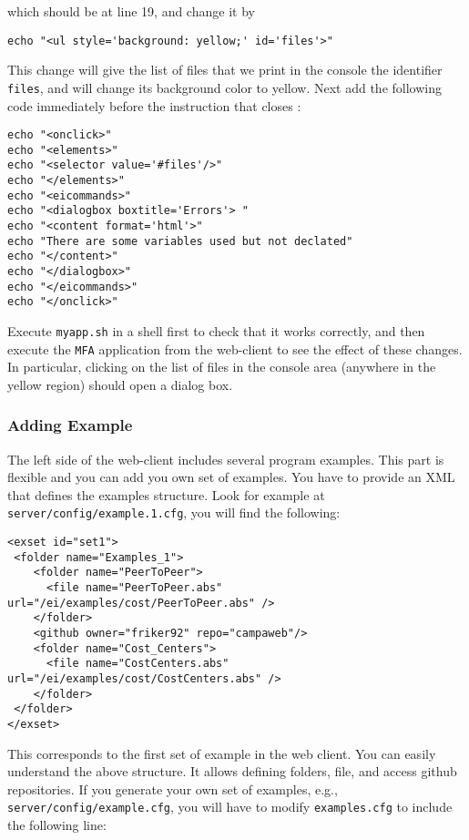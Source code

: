 \medskip
\noindent
which should be at line 19, and change it by

\medskip
\begin{lstlisting}[style=script]
echo "<ul style='background: yellow;' id='files'>"
\end{lstlisting}

\medskip
\noindent
This change will give the list of files that we print in the console
the identifier \texttt{files}, and will change its background color to
yellow. Next add the following code immediately before the instruction
that closes :

\medskip
\begin{lstlisting}[style=script]
echo "<onclick>"
echo "<elements>"
echo "<selector value='#files'/>"
echo "</elements>"
echo "<eicommands>"
echo "<dialogbox boxtitle='Errors'> "
echo "<content format='html'>"
echo "There are some variables used but not declated"
echo "</content>"
echo "</dialogbox>"
echo "</eicommands>"
echo "</onclick>"
\end{lstlisting}

\medskip
\noindent
Execute \texttt{myapp.sh} in a shell first to check that it works
correctly, and then execute the \texttt{MFA} application from the
web-client to see the effect of these changes. In particular, clicking
on the list of files in the console area (anywhere in the yellow
region) should open a dialog box.

\subsubsection{Adding Example}

The left side of the web-client includes several program
examples. This part is flexible and you can add you own set of
examples. You have to provide an XML that defines the examples
structure. Look for example at \texttt{server/config/example.1.cfg},
you will find the following:

\medskip
\begin{lstlisting}
<exset id="set1">
 <folder name="Examples_1">
    <folder name="PeerToPeer">
      <file name="PeerToPeer.abs" url="/ei/examples/cost/PeerToPeer.abs" />
    </folder>
    <github owner="friker92" repo="campaweb"/>
    <folder name="Cost_Centers">
      <file name="CostCenters.abs" url="/ei/examples/cost/CostCenters.abs" />
    </folder>
 </folder>
</exset>
\end{lstlisting}

\medskip
\noindent
This corresponds to the first set of example in the web client. You
can easily understand the above structure. It allows defining folders,
file, and access github repositories. If you generate your own set of
examples, e.g., \texttt{server/config/example.cfg}, you will have to
modify \texttt{examples.cfg} to include the following line:

